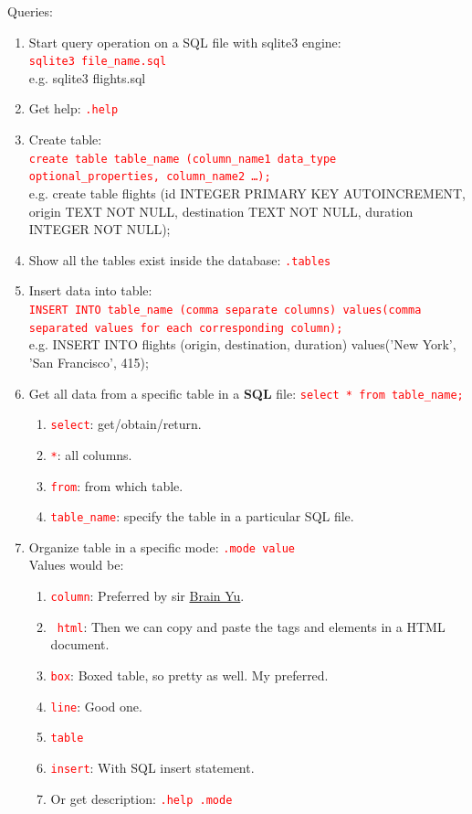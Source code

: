 \documentclass[12 pt, letterpaper]{extarticle}
\newcommand{\R}{\textcolor{red}} %
\newcommand{\T}{\texttt}
\begin{document}
\pagebreak
Queries:
\begin{enumerate}
	\item Start query operation on a SQL file with sqlite3 engine:\\
	      \R{\T{sqlite3 file\_name.sql}}\\
	      e.g. \textcolor{red!70}{sqlite3 flights.sql}
	\item Get help: \R{\T{.help}}
	\item Create table: \\
	      \R{\T{create table table\_name (column\_name1 data\_type optional\_properties, column\_name2 \dots);}}\\
	      e.g. \textcolor{red!70}{create table flights (id INTEGER PRIMARY KEY AUTOINCREMENT, origin TEXT NOT NULL, destination TEXT NOT NULL, duration INTEGER NOT NULL);}
	\item Show all the tables exist inside the database: \R{\T{.tables}}
	\item Insert data into table:\\
	      \R{\T{INSERT INTO table\_name (comma separate columns) values(comma separated values for each corresponding column);}}\\
	      e.g. \textcolor{red!70}{INSERT INTO flights (origin, destination, duration) values('New York', 'San Francisco', 415);}

	\item Get all data from a specific table in a \textbf{SQL} file: \R{\T{select * from table\_name;}}
	      \begin{enumerate}
		      \item \R{\T{select}}: get/obtain/return.
		      \item \R{\T{*}}: all columns.
		      \item \R{\T{from}}: from which table.
		      \item \R{\T{table\_name}}: specify the table in a particular SQL file.
	      \end{enumerate}

	\item Organize table in a specific mode: \R{\T{.mode value}}\\
	      Values would be:
	      \begin{enumerate}
		      \item \R{\T{column}}:  Preferred by sir \href{https://brianyu.me/}{Brain Yu}.
		      \item \R{\T{ html}}: Then we can copy and paste the tags and elements in a HTML document.
		      \item \R{\T{box}}: Boxed table, so pretty as well. My preferred.
		      \item \R{\T{line}}:  Good one.
		      \item \R{\T{table}}
		      \item \R{\T{insert}}: With SQL insert statement.
		      \item Or get description: \R{\T{.help .mode}}
	      \end{enumerate}


\end{enumerate}
\end{document}
